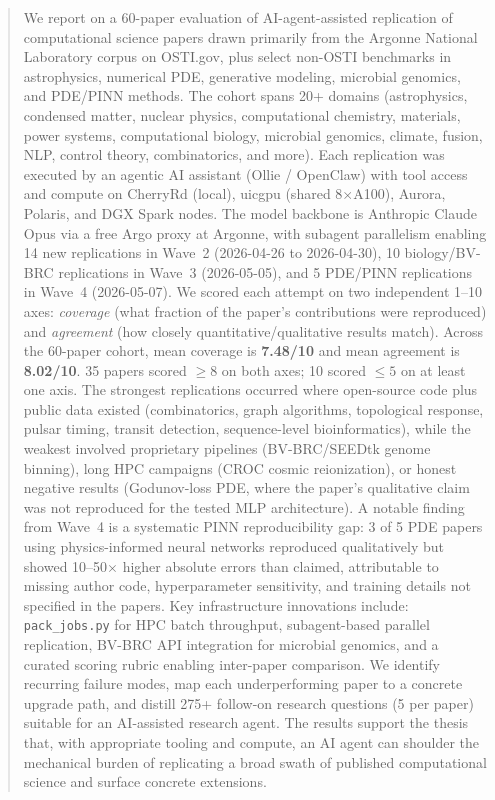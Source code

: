\begin{abstract}
\noindent We report on a 60-paper evaluation of AI-agent-assisted replication of
computational science papers drawn primarily from the Argonne National Laboratory
corpus on OSTI.gov, plus select non-OSTI benchmarks in astrophysics,
numerical PDE, generative modeling, microbial genomics, and PDE/PINN methods. The cohort spans 20+ domains
(astrophysics, condensed matter, nuclear physics, computational chemistry,
materials, power systems, computational biology, microbial genomics, climate, fusion, NLP,
control theory, combinatorics, and more). Each replication was executed by an
agentic AI assistant (Ollie / OpenClaw) with tool access and compute on
CherryRd (local), uicgpu (shared 8$\times$A100), Aurora, Polaris, and DGX Spark
nodes. The model backbone is Anthropic Claude Opus via a free Argo proxy at
Argonne, with subagent parallelism enabling 14 new replications in Wave~2
(2026-04-26 to 2026-04-30), 10 biology/BV-BRC replications in Wave~3
(2026-05-05), and 5 PDE/PINN replications in Wave~4 (2026-05-07). We scored each attempt on two independent 1--10 axes:
\emph{coverage} (what fraction of the paper's contributions were reproduced)
and \emph{agreement} (how closely quantitative/qualitative results match).
Across the 60-paper cohort, mean coverage is \textbf{7.48/10} and mean
agreement is \textbf{8.02/10}. 35 papers scored $\geq 8$ on both axes; 10
scored $\leq 5$ on at least one axis. The strongest replications occurred
where open-source code plus public data existed (combinatorics, graph
algorithms, topological response, pulsar timing, transit detection,
sequence-level bioinformatics), while the
weakest involved proprietary pipelines (BV-BRC/SEEDtk genome binning), long HPC
campaigns (CROC cosmic reionization), or honest negative results
(Godunov-loss PDE, where the paper's qualitative claim was not reproduced for
the tested MLP architecture). A notable finding from Wave~4 is a systematic
PINN reproducibility gap: 3 of 5 PDE papers using physics-informed neural
networks reproduced qualitatively but showed 10--50$\times$ higher absolute
errors than claimed, attributable to missing author code, hyperparameter
sensitivity, and training details not specified in the papers.
Key infrastructure innovations include:
\texttt{pack\_jobs.py} for HPC batch throughput, subagent-based parallel
replication, BV-BRC API integration for microbial genomics, and a curated
scoring rubric enabling inter-paper comparison.
We identify recurring failure modes, map each underperforming paper to a
concrete upgrade path, and distill 275+ follow-on research questions (5 per
paper) suitable for an AI-assisted research agent. The results support the
thesis that, with appropriate tooling and compute, an AI agent can shoulder
the mechanical burden of replicating a broad swath of published computational
science and surface concrete extensions.
\end{abstract}
